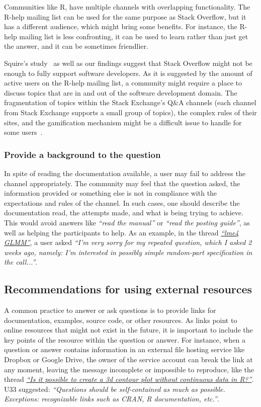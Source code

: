 Communities like R, have multiple channels with overlapping functionality.
The R-help mailing list can be used for the same purpose as Stack Overflow, but it has a different audience, which might bring some benefits.
For instance, the R-help mailing list is less confronting, it can be used to learn rather than just get the answer, and it can be sometimes friendlier.

Squire's study~\cite{Squire2015a} as well as our findings suggest that Stack Overflow might not be enough to fully support software developers.
As it is suggested by the amount of active users on the R-help mailing list, a community might require a place to discuss topics that are in and out of the software development domain.
The fragmentation of topics within the Stack Exchange's Q\&A channels (each channel from Stack Exchange supports a small group of topics), the complex rules of their sites, and the gamification mechanism might be a difficult issue to handle for some users~\cite{Vasilescu2013}.

\subsubsection{Provide a background to the question}

In spite of reading the documentation available, a user may fail to address the channel appropriately.
The community may feel that the question asked, the information provided or something else is not in compliance with the expectations and rules of the channel.
In such cases, one should describe the documentation read, the attempts made, and what is being trying to achieve.
This would avoid answers like \textit{``read the manual''} or \textit{``read the posting guide''}, as well as helping the participants to help.
As an example, in the thread \textit{\href{https://goo.gl/Gbek3R}{``lme4 GLMM''}}, a user asked \textit{``I'm very sorry for my repeated question, which I asked 2 weeks ago, namely: I'm interested in possibly simple random-part specification in the call...''}.

\subsection{Recommendations for using external resources}

A common practice to answer or ask questions is to provide links for documentation, examples, source code, or other resources.
    As links point to online resources that might not exist in the future, it is important to include the key points of the resource within the question or answer.
    For instance, when a question or answer contains information in an external file hosting service like Dropbox or Google Drive, the owner of the service account can break the link at any moment, leaving the message incomplete or impossible to reproduce, like the thread \textit{\href{http://goo.gl/5nanFU}{``Is it possible to create a 3d contour plot without continuous data in R?''}}.
    U33 suggested: \textit{``Questions should be self-contained as much as possible. Exceptions: recognizable links such as CRAN, R documentation, etc.''}.

